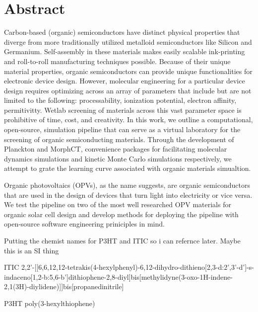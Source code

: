 
\chapter*{Abstract}

Carbon-based (organic) semiconductors have distinct physical properties that diverge from more traditionally
utilized metalloid semiconductors like Silicon and Germanium.
Self-assembly in these materials makes easily scalable ink-printing and roll-to-roll manufacturing techniques
possible. 
Because of their unique material properties, organic semiconductors can provide unique functionalities 
for electronic device design.
However, molecular engineering for a particular device design
requires optimizing across an array of parameters that include but are
not limited to the following: processability, ionization potential, electron affinity, permitivitty. 
Wetlab screening of materials across
this vast parameter space is prohibitive of time, cost, and creativity. 
In this work, we outline a computational, open-source, simulation pipeline that can serve as a 
virtual laboratory for the screening of organic semiconducting materials. 
Through the development of Planckton and MorphCT, convenience packages for facilitating molecular dynamics
simulations and kinetic Monte Carlo simulations respectively, we attempt to grate the learning curve
associated with organic materials simualtion. 

Organic photovoltaics (OPVs), as the name suggests, are organic semiconductors that are used in the design of
devices that turn light into electricity or vice versa.  
We test the pipeline on
two of the most well researched OPV materials for organic solar cell design and develop methods for deploying
the pipeline with open-source software engineering priniciples in mind.


Putting the chemist names for P3HT and ITIC so i can refernce later. Maybe this is an SI thing

ITIC
2,2'-[[6,6,12,12-tetrakis(4-hexylphenyl)-6,12-dihydro-dithieno[2,3-d:2',3'-d']-s-indaceno[1,2-b:5,6-b']dithiophene-2,8-diyl]bis[methylidyne(3-oxo-1H-indene-2,1(3H)-diylidene)]]bis[propanedinitrile]

P3HT poly(3-hexylthiophene)




